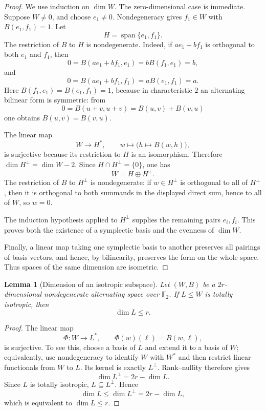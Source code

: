 \documentclass[11pt]{article}
\newtheorem{lemma}[theorem]{Lemma}
\theoremstyle{definition}
\newcommand{\F}{\mathbb{F}}
\newcommand{\Span}{\operatorname{span}}
\begin{document}
\begin{proof}
We use induction on $\dim W$.  The zero-dimensional case is immediate.  Suppose $W\ne0$, and choose $e_1\ne0$.  Nondegeneracy gives $f_1\in W$ with $B(e_1,f_1)=1$.  Let
\[
 H=\Span\{e_1,f_1\}.
\]
The restriction of $B$ to $H$ is nondegenerate.  Indeed, if $ae_1+bf_1$ is orthogonal to both $e_1$ and $f_1$, then
\[
 0=B(ae_1+bf_1,e_1)=bB(f_1,e_1)=b,
\]
and
\[
 0=B(ae_1+bf_1,f_1)=aB(e_1,f_1)=a.
\]
Here $B(f_1,e_1)=B(e_1,f_1)=1$, because in characteristic $2$ an alternating bilinear form is symmetric: from
\[
 0=B(u+v,u+v)=B(u,v)+B(v,u)
\]
one obtains $B(u,v)=B(v,u)$.

The linear map
\[
 W\longrightarrow H^*,
 \qquad
 w\longmapsto\bigl(h\mapsto B(w,h)\bigr),
\]
is surjective because its restriction to $H$ is an isomorphism.  Therefore $\dim H^\perp=\dim W-2$.  Since $H\cap H^\perp=\{0\}$, one has
\[
 W=H\oplus H^\perp.
\]
The restriction of $B$ to $H^\perp$ is nondegenerate: if $w\in H^\perp$ is orthogonal to all of $H^\perp$, then it is orthogonal to both summands in the displayed direct sum, hence to all of $W$, so $w=0$.

The induction hypothesis applied to $H^\perp$ supplies the remaining pairs $e_i,f_i$.  This proves both the existence of a symplectic basis and the evenness of $\dim W$.

Finally, a linear map taking one symplectic basis to another preserves all pairings of basis vectors, and hence, by bilinearity, preserves the form on the whole space.  Thus spaces of the same dimension are isometric.
\end{proof}

\begin{lemma}[Dimension of an isotropic subspace]\label{lem:isotropic-dimension}
Let $(W,B)$ be a $2r$-dimensional nondegenerate alternating space over $\F_2$.  If $L\le W$ is totally isotropic, then
\[
 \dim L\le r.
\]
\end{lemma}

\begin{proof}
The linear map
\[
 \Phi:W\longrightarrow L^*,
 \qquad
 \Phi(w)(\ell)=B(w,\ell),
\]
is surjective.  To see this, choose a basis of $L$ and extend it to a basis of $W$; equivalently, use nondegeneracy to identify $W$ with $W^*$ and then restrict linear functionals from $W$ to $L$.  Its kernel is exactly $L^\perp$.  Rank--nullity therefore gives
\[
 \dim L^\perp=2r-\dim L.
\]
Since $L$ is totally isotropic, $L\subseteq L^\perp$.  Hence
\[
 \dim L\le\dim L^\perp=2r-\dim L,
\]
which is equivalent to $\dim L\le r$.
\end{proof}
\end{document}
